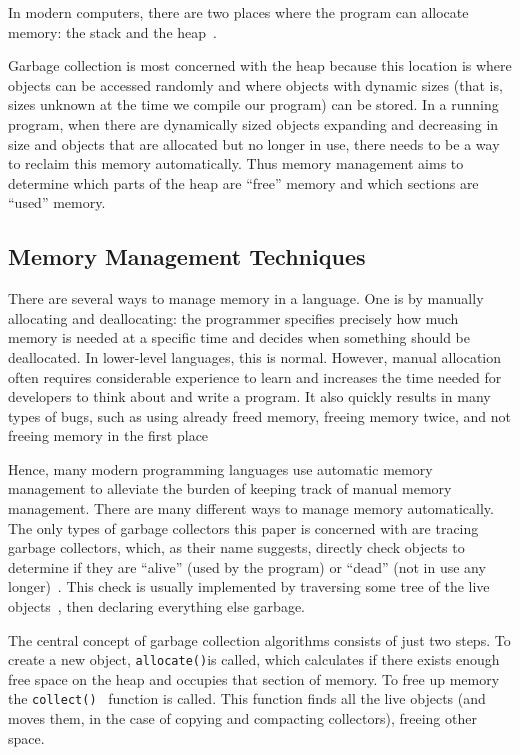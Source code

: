 \documentclass[index]{subfiles}
\begin{document}
In modern computers, there are two places where the program can allocate memory: the stack and the heap~\parencite{the_rust_programming_language}.

Garbage collection is most concerned with the heap because this location is where objects can be accessed randomly and where objects with dynamic sizes (that is, sizes unknown at the time we compile our program) can be stored. In a running program, when there are dynamically sized objects expanding and decreasing in size and objects that are allocated but no longer in use, there needs to be a way to reclaim this memory automatically. Thus memory management aims to determine which parts of the heap are ``free'' memory and which sections are ``used'' memory.

\subsection{Memory Management Techniques}

There are several ways to manage memory in a language. One is by manually allocating and deallocating: the programmer specifies precisely how much memory is needed at a specific time and decides when something should be deallocated. In lower-level languages, this is normal. However, manual allocation often requires considerable experience to learn and increases the time needed for developers to think about and write a program. It also quickly results in many types of bugs, such as using already freed memory, freeing memory twice, and not freeing memory in the first place~\parencites{garbage_collection_overview_uw}[Chapter~1]{gc_handbook}

Hence, many modern programming languages use automatic memory management to alleviate the burden of keeping track of manual memory management. There are many different ways to manage memory automatically. The only types of garbage collectors this paper is concerned with are tracing garbage collectors, which, as their name suggests, directly check objects to determine if they are ``alive'' (used by the program) or ``dead'' (not in use any longer)~\parencite{a_unified_theory_of_garbage_collection}. This check is usually implemented by traversing some tree of the live objects~\parencite[Chapter~1]{gc_handbook}, then declaring everything else garbage.

The central concept of garbage collection algorithms consists of just two steps. To create a new object, \verb+allocate()+is called, which calculates if there exists enough free space on the heap and occupies that section of memory. To free up memory the \verb+collect()+~\parencite{gc_handbook} function is called. This function finds all the live objects (and moves them, in the case of copying and compacting collectors), freeing other space.
\end{document}
